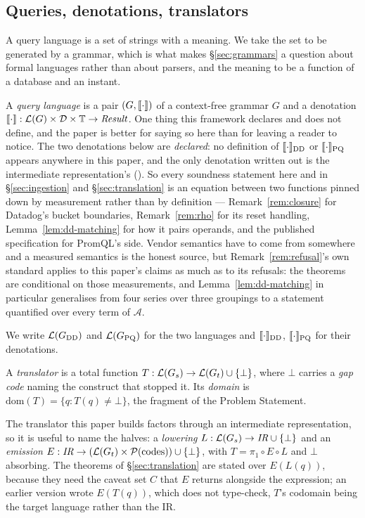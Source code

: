 \subsection{Queries, denotations, translators}

A query language is a set of strings with a meaning. We take the set to be generated by a
grammar, which is what makes \S\ref{sec:grammars} a question about formal languages
rather than about parsers, and the meaning to be a function of a database and an instant.

\begin{definition}\label{def:lang}
A \emph{query language} is a pair $(G,\llbracket \cdot \rrbracket)$ of a context-free grammar $G$ and a
denotation $\llbracket \cdot \rrbracket:\mathcal{L}(G)\times\mathcal{D}\times\mathbb{T}\to\mathit{Result}$.
One thing this framework declares and does not define, and the paper is better for
saying so here than for leaving a reader to notice. The two denotations below are
\emph{declared}: no definition of $\llbracket \cdot \rrbracket_{\mathrm{DD}}$ or
$\llbracket \cdot \rrbracket_{\mathrm{PQ}}$ appears anywhere in this paper, and the only denotation
written out is the intermediate representation's (). So every
soundness statement here and in \S\ref{sec:ingestion} and \S\ref{sec:translation} is an
equation between two functions pinned down by measurement rather than by definition ---
Remark~\ref{rem:closure} for Datadog's bucket boundaries, Remark~\ref{rem:rho} for its
reset handling, Lemma~\ref{lem:dd-matching} for how it pairs operands, and the published
specification for PromQL's side. Vendor semantics have to come from somewhere and a
measured semantics is the honest source, but Remark~\ref{rem:refusal}'s own standard
applies to this paper's claims as much as to its refusals: the theorems are conditional
on those measurements, and Lemma~\ref{lem:dd-matching} in particular generalises from
four series over three groupings to a statement quantified over every term of
$\mathcal{A}$.

We write $\mathcal{L}(G_{\mathrm{DD}})$ and $\mathcal{L}(G_{\mathrm{PQ}})$ for the two languages and
$\llbracket \cdot \rrbracket_{\mathrm{DD}}$, $\llbracket \cdot \rrbracket_{\mathrm{PQ}}$ for their denotations.
\end{definition}

\begin{definition}[Translator]\label{def:translator}
A \emph{translator} is a total function
$T:\mathcal{L}(G_s)\to\mathcal{L}(G_t)\cup\{\bot\}$, where $\bot$ carries a \emph{gap code} naming
the construct that stopped it. Its \emph{domain} is
$\mathrm{dom}(T)=\{q : T(q)\neq\bot\}$, the fragment of the Problem Statement.

The translator this paper builds factors through an intermediate representation, so it
is useful to name the halves: a \emph{lowering} $L:\mathcal{L}(G_s)\to\mathit{IR}\cup\{\bot\}$
and an \emph{emission} $E:\mathit{IR}\to(\mathcal{L}(G_t)\times\mathcal{P}(\text{codes}))
\cup\{\bot\}$, with $T=\pi_1\circ E\circ L$ and $\bot$ absorbing. The theorems of
\S\ref{sec:translation} are stated over $E(L(q))$, because they need the caveat set $C$
that $E$ returns alongside the expression; an earlier version wrote $E(T(q))$, which does
not type-check, $T$'s codomain being the target language rather than the IR.
\end{definition}

